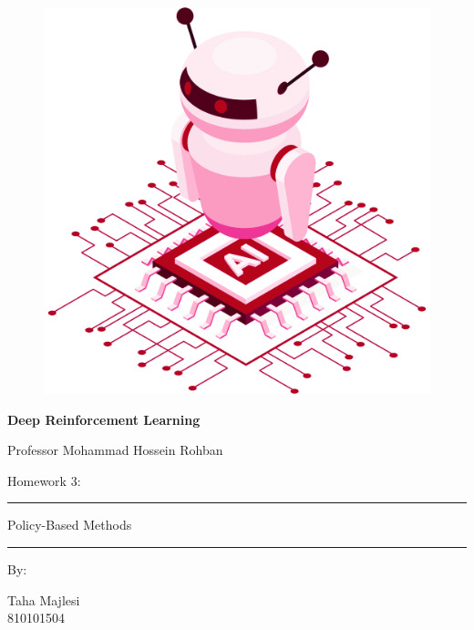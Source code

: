 \documentclass[12pt]{article}
\begin{document}
\thispagestyle{plain}

\begin{center}

\vspace*{-1.5cm}
\begin{figure}[!h]
    \centering
    \includegraphics[width=0.7\linewidth]{figs/cover-std.png}
\end{figure}

{

{\color{DarkBlue} {\fontsize{30}{50} \textbf{
Deep Reinforcement Learning
}}}

{\color{DarkBlue} {\Large
Professor Mohammad Hossein Rohban
}}
}


\vspace{20pt}

{


{\color{RedOrange}
{\Large
Homework 3:
}\\
}
{\color{BrickRed}
\rule{12cm}{0.5pt}

{\Huge
Policy-Based Methods
}
\rule{12cm}{0.5pt}
}

\vspace{10pt}

{\color{RoyalPurple} { \small By:} } \\
\vspace{10pt}

{\color{Blue} { \LARGE Taha Majlesi } } \\
\vspace{5pt}
{\color{RoyalBlue} { \Large 810101504 } }


}
\end{center}
\end{document}
